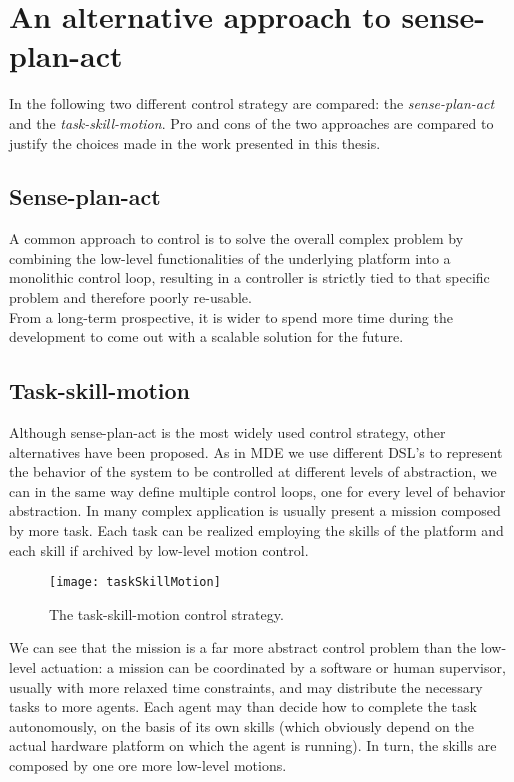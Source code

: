 \chapter{An alternative approach to sense-plan-act}
\label{ch:sense-plan-act}
In the following two different control strategy are compared: the \emph{sense-plan-act} and the \emph{task-skill-motion}. Pro and cons of the two approaches are compared to justify the choices made in the work presented in this thesis.

\section{Sense-plan-act}
A common approach to control is to solve the overall complex problem by combining the low-level functionalities of the underlying platform into a monolithic control loop, resulting in a controller is strictly tied to that specific problem and therefore poorly re-usable.\\
From a long-term prospective, it is wider to spend more time during the development to come out with a scalable solution for the future.

\section{Task-skill-motion}
Although sense-plan-act is the most widely used control strategy, other alternatives have been proposed. As in MDE we use different DSL's to represent the behavior of the system to be controlled at different levels of abstraction, we can in the same way define multiple control loops, one for every level of behavior abstraction. In many complex application is usually present a mission composed by more task. Each task can be realized employing the skills of the platform and each skill if archived by low-level motion control.\\
\begin{wrapfigure}{r}{0.5\textwidth} %
	\texttt{[image: taskSkillMotion]}
	\caption{The task-skill-motion control strategy.}
	\label{fig:taskSkillMotion}
\end{wrapfigure}
We can see that the mission is a far more abstract control problem than the low-level actuation: a mission can be coordinated by a software or human supervisor, usually with more relaxed time constraints, and may distribute the necessary tasks to more agents. Each agent may than decide how to complete the task autonomously, on the basis of its own skills (which obviously depend on the actual hardware platform on which the agent is running). In turn, the skills are composed by one ore more low-level motions.\\
